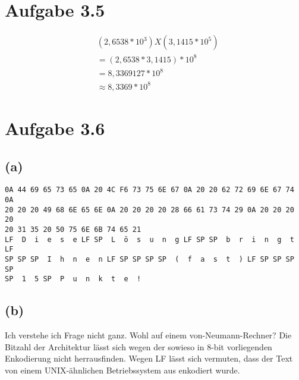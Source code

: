 \documentclass[12pt]{article}
\begin{document}
\section{Aufgabe 3.5}
\begin{align}
&(2,6538 * 10^3) X (3,1415 * 10^5)\\
&= (2,6538 * 3,1415) * 10^8\\
&= 8,3369127 * 10^8\\
&\approx 8,3369 * 10^8
\end{align}

\section{Aufgabe 3.6}
\subsection{(a)}
\begin{verbatim}
0A 44 69 65 73 65 0A 20 4C F6 73 75 6E 67 0A 20 20 62 72 69 6E 67 74 0A
20 20 20 49 68 6E 65 6E 0A 20 20 20 20 28 66 61 73 74 29 0A 20 20 20 20
20 31 35 20 50 75 6E 6B 74 65 21
LF  D  i  e  s  e LF SP  L  ö  s  u  n  g LF SP SP  b  r  i  n  g  t LF
SP SP SP  I  h  n  e  n LF SP SP SP SP  (  f  a  s  t  ) LF SP SP SP SP
SP  1  5 SP  P  u  n  k  t  e  !
\end{verbatim}
\subsection{(b)}
Ich verstehe ich Frage nicht ganz. Wohl auf einem von-Neumann-Rechner? Die Bitzahl der Architektur lässt sich wegen der sowieso in 8-bit vorliegenden Enkodierung nicht herrausfinden. Wegen LF lässt sich vermuten, dass der Text von einem UNIX-ähnlichen Betriebssystem aus enkodiert wurde.
\end{document}
